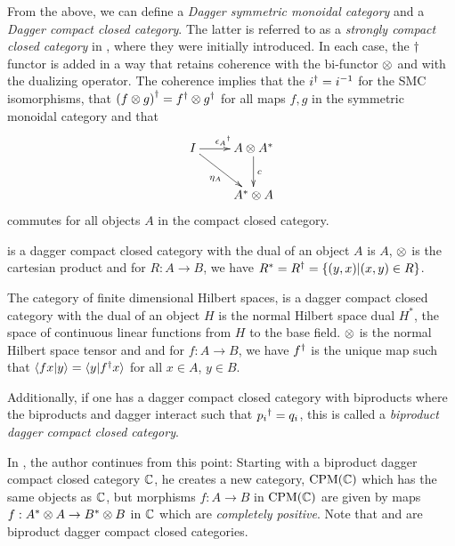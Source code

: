 From the above, we can define a \emph{Dagger symmetric monoidal category} and a \emph{Dagger
compact closed category}. The latter is referred to as a \emph{strongly compact closed category} in
\cite{abramsky02:traces}, where they were initially introduced. In each case, the $\dagger$ functor
is added in a way that retains coherence with the bi-functor $\otimes$ and with the dualizing operator.
The coherence implies that the ${i}^{\dagger} = i^{-1}$ for the SMC isomorphisms, that ${(f\otimes g)}^{\dagger} =
{f}^{\dagger}\otimes{g}^{\dagger}$ for all maps $f,g$ in the symmetric monoidal category and that
\[
  \xymatrix{
    I \ar[dr]_{\eta_A} \ar[r]^{\dgr{\epsilon_A}} & A\* \dual{A} \ar[d]^{c} \\
    &\dual{A}\*A
  }
\]
commutes for all objects $A$ in the compact closed category.


\begin{example}[\rel]
  \rel is a dagger compact closed category with the dual of an object $A$ is $A$, $\otimes$ is the
  cartesian product and for $R:A\to B$, we have ${R}^{*} = {R}^{\dagger} = \{(y,x) | (x,y) \in R\}$.
\end{example}
\begin{example}[\fdh]
  The category of finite dimensional Hilbert spaces, \fdh is a dagger compact closed category with
  the dual of an object $H$ is the normal Hilbert space dual $H^{*}$, the space of continuous
  linear functions from $H$ to the base field. $\otimes$ is the normal Hilbert space tensor and and for
  $f:A\to B$, we have ${f}^{\dagger}$ is the unique map such that $\langle f x | y \rangle = \langle y |
  {f}^{\dagger}x \rangle$ for all $x\in A$, $y \in B$.
\end{example}

Additionally, if one has a dagger compact closed category with biproducts where the biproducts and
dagger interact such that ${p_i}^{\dagger} = q_i$, this is called a \emph{biproduct dagger compact closed
category}.

In \cite{selinger05:dagger}, the author continues from this point: Starting with a biproduct dagger
compact closed category $\mathbb{C}$, he creates a new category, $\text{CPM}(\mathbb{C})$ which has the same
objects as $\mathbb{C}$, but morphisms $f:A \to B$ in $\text{CPM}(\mathbb{C})$ are given by maps $f:{A}^{*} \otimes A
\to {B}^{*} \otimes B$ in $\mathbb{C}$ which are \emph{completely positive}. Note that \rel and \fdh are
biproduct dagger compact closed categories.

